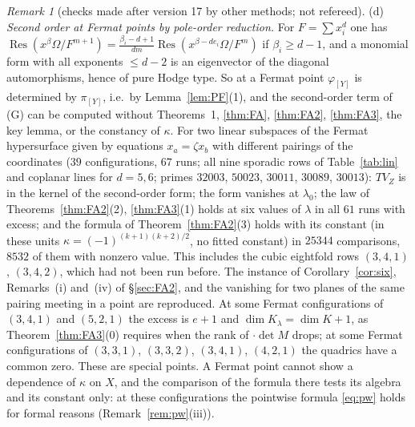 \documentclass[11pt]{article}
\numberwithin{equation}{section}
\theoremstyle{remark}
\newtheorem{remark}[theorem]{Remark}
\newcommand{\VZ}{V_Z}
\newcommand{\Res}{\operatorname{Res}}
\newcommand{\lz}{\lambda_0}
\begin{document}
\begin{remark}[checks made after version 17 by other methods; not refereed]
(d) \emph{Second order at Fermat points by pole-order reduction.} For $F=\sum x_i^d$ one has
$\Res(x^\beta\Omega/F^{m+1})=\frac{\beta_i-d+1}{dm}\Res(x^{\beta-de_i}\Omega/F^m)$ if $\beta_i\ge d-1$, and a
monomial form with all exponents $\le d-2$ is an eigenvector of the diagonal automorphisms, hence of pure Hodge
type. So at a Fermat point $\varphi_{[Y]}$ is determined by $\pi_{[Y]}$, i.e.\ by Lemma~\ref{lem:PF}(1), and the
second-order term of (G) can be computed without Theorems~1, \ref{thm:FA}, \ref{thm:FA2}, \ref{thm:FA3}, the key
lemma, or the constancy of $\kappa$. For two linear subspaces of the Fermat hypersurface given by equations
$x_a=\zeta x_b$ with different pairings of the coordinates ($39$ configurations, $67$ runs; all nine sporadic rows
of Table~\ref{tab:lin} and coplanar lines for $d=5,6$; primes $32003$, $50023$, $30011$, $30089$, $30013$): $T\VZ$ is in
the kernel of the second-order form; the form vanishes at $\lz$; the law of Theorems~\ref{thm:FA2}(2),
\ref{thm:FA3}(1) holds at six values of $\lambda$ in all $61$ runs with excess; and the formula of
Theorem~\ref{thm:FA2}(3) holds with its constant (in these units $\kappa=(-1)^{(k+1)(k+2)/2}$, no fitted constant)
in $25344$ comparisons, $8532$ of them with nonzero value. This includes the cubic eightfold rows $(3,4,1)$,
$(3,4,2)$, which had not been run before. The instance of Corollary~\ref{cor:six}, Remarks~(i) and~(iv) of
\S\ref{sec:FA2}, and the vanishing for two planes of the same pairing meeting in a point are reproduced. At some
Fermat configurations of $(3,4,1)$ and $(5,2,1)$ the excess is $e+1$ and $\dim K_\lambda=\dim K+1$, as
Theorem~\ref{thm:FA3}(0) requires when the rank of $\cdot\det M$ drops; at some Fermat configurations of $(3,3,1)$,
$(3,3,2)$, $(3,4,1)$, $(4,2,1)$ the quadrics have a common zero. These are special points. A Fermat point cannot show a dependence of $\kappa$ on $X$, and the comparison of
the formula there tests its algebra and its constant only: at these configurations the pointwise formula
\eqref{eq:pw} holds for formal reasons (Remark~\ref{rem:pw}(iii)).


\end{remark}
\end{document}
